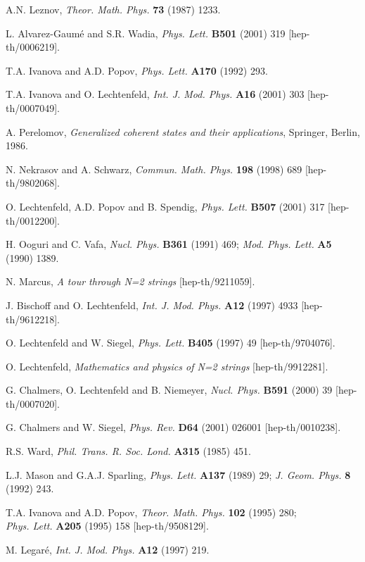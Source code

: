 \documentclass[a4paper,11pt]{article}
\numberwithin{equation}{section}
\begin{document}
\begin{thebibliography}{99}
A.N. Leznov,
{\sl Theor. Math. Phys.} {\bf 73} (1987) 1233.

L. Alvarez-Gaum\'e and S.R. Wadia,
{\sl Phys. Lett.} {\bf B501} (2001) 319 [hep-th/0006219].

T.A. Ivanova and A.D. Popov,
{\sl Phys. Lett.} {\bf A170} (1992) 293.

T.A. Ivanova and O. Lechtenfeld,
{\sl Int. J. Mod. Phys.} {\bf A16} (2001) 303 [hep-th/0007049].

A. Perelomov,
{\it Generalized coherent states and their applications},
Springer, Berlin, 1986.

N. Nekrasov and A. Schwarz,
{\sl Commun. Math. Phys.} {\bf 198} (1998) 689 [hep-th/9802068].

O. Lechtenfeld, A.D. Popov and B. Spendig,
{\sl Phys. Lett.} {\bf B507} (2001) 317 [hep-th/0012200].

H. Ooguri and C. Vafa,
{\sl Nucl. Phys.} {\bf B361} (1991) 469;
{\sl Mod. Phys. Lett.} {\bf A5} (1990) 1389.

N. Marcus,
{\it A tour through N=2 strings}
[hep-th/9211059].

J. Bischoff and O. Lechtenfeld,
{\sl Int. J. Mod. Phys.} {\bf A12} (1997) 4933 [hep-th/9612218].

O. Lechtenfeld and W. Siegel,
{\sl Phys. Lett.} {\bf B405} (1997) 49 [hep-th/9704076].

O. Lechtenfeld,
{\it Mathematics and physics of N=2 strings}
[hep-th/9912281].

G. Chalmers, O. Lechtenfeld and B. Niemeyer,
{\sl Nucl. Phys.} {\bf B591} (2000) 39 [hep-th/0007020].

G. Chalmers and W. Siegel,
{\sl Phys. Rev.} {\bf D64} (2001) 026001 [hep-th/0010238].

R.S. Ward,
{\sl Phil. Trans. R. Soc. Lond.} {\bf A315} (1985) 451.

L.J. Mason and G.A.J. Sparling,
{\sl Phys. Lett.} {\bf A137} (1989) 29;
{\sl J. Geom. Phys.} {\bf 8} (1992) 243.

T.A. Ivanova and A.D. Popov,
{\sl Theor. Math. Phys.} {\bf 102} (1995) 280;\\
{\sl Phys. Lett.} {\bf A205} (1995) 158 [hep-th/9508129].

M. Legar\'e,
{\sl Int. J. Mod. Phys.} {\bf A12} (1997) 219.


\end{thebibliography}
\end{document}
